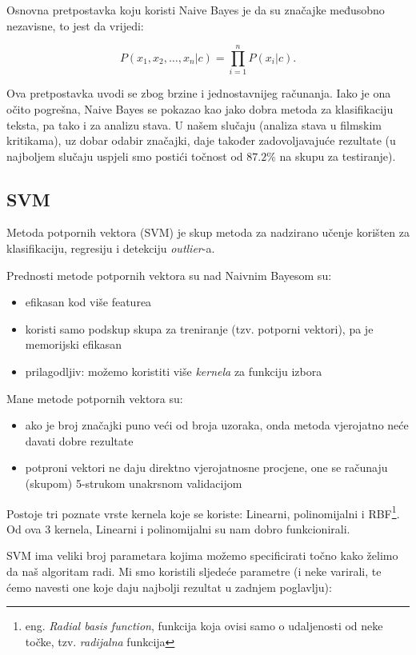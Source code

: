 \documentclass[conference]{IEEEtran}
\begin{document}
Osnovna pretpostavka koju koristi Naive Bayes je da su značajke međusobno nezavisne, to jest da vrijedi:

\[P(x_1, x_2, \ldots, x_n|c) = \prod_{i=1}^n P(x_i|c).\]

Ova pretpostavka uvodi se zbog brzine i jednostavnijeg računanja. Iako je ona očito pogrešna, Naive Bayes se pokazao kao jako dobra metoda za klasifikaciju teksta, pa tako i za analizu stava. U našem slučaju (analiza stava u filmskim kritikama), uz dobar odabir značajki, daje također zadovoljavajuće rezultate (u najboljem slučaju uspjeli smo postići točnost od $87.2\%$ na skupu za testiranje).

\subsection{SVM}

Metoda potpornih vektora (SVM) je skup metoda za nadzirano učenje korišten za
klasifikaciju, regresiju i detekciju \textit{outlier}-a.

Prednosti metode potpornih vektora su nad Naivnim Bayesom su:

\begin{itemize}
  \item efikasan kod više featurea
  \item koristi samo podskup skupa za treniranje (tzv. potporni vektori), pa je
    memorijski efikasan
  \item prilagodljiv: možemo koristiti više \textit{kernela} za funkciju izbora
\end{itemize}

Mane metode potpornih vektora su:

\begin{itemize}
  \item ako je broj značajki puno veći od broja uzoraka, onda metoda vjerojatno
    neće davati dobre rezultate
  \item potproni vektori ne daju direktno vjerojatnosne procjene, one se računaju
    (skupom) 5-strukom unakrsnom validacijom
\end{itemize}

Postoje tri poznate vrste kernela koje se koriste: Linearni, polinomijalni i
RBF\footnote{eng. \textit{Radial basis function}, funkcija koja ovisi samo o
udaljenosti od neke točke, tzv. \textit{radijalna} funkcija}. Od ova 3 kernela,
Linearni i polinomijalni su nam dobro funkcionirali.

SVM ima veliki broj parametara kojima možemo specificirati točno kako želimo
da naš algoritam radi. Mi smo koristili sljedeće parametre (i
neke varirali, te ćemo navesti one koje daju najbolji rezultat u zadnjem
poglavlju):
\end{document}
